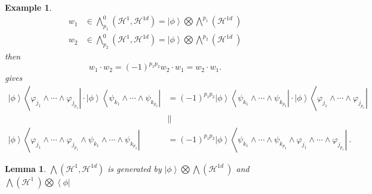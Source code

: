 \documentclass[aps,preprint]{revtex4}%
\newtheorem{example}[theorem]{Example}
\newtheorem{lemma}[theorem]{Lemma}
\begin{document}
\begin{example}%
\begin{align}
w_{1}  &  \in%
{\textstyle\bigwedge\nolimits_{p_{1}}^{0}}
\left(  \mathcal{H}^{1},\mathcal{H}^{1d}\right)  =\left\vert \phi
\right\rangle
{\textstyle\bigotimes}
{\textstyle\bigwedge\nolimits^{p_{1}}}
\left(  \mathcal{H}^{1d}\ \right) \\
w_{2}  &  \in%
{\textstyle\bigwedge\nolimits_{p_{2}}^{0}}
\left(  \mathcal{H}^{1},\mathcal{H}^{1d}\right)  =\left\vert \phi
\right\rangle
{\textstyle\bigotimes}
{\textstyle\bigwedge\nolimits^{p_{2}}}
\left(  \mathcal{H}^{1d}\ \right)
\end{align}
then
\begin{equation}
w_{1}\cdot w_{2}=\left(  -1\right)  ^{p_{1}p_{2}}w_{2}\cdot w_{1}=w_{2}\cdot
w_{1}.
\end{equation}
gives
\begin{align}
\left\vert \phi\right\rangle \left\langle \varphi_{j_{1}}\wedge\cdots
\wedge\varphi_{j_{p_{1}}}\right\vert \cdot\left\vert \phi\right\rangle
\left\langle \psi_{k_{1}}\wedge\cdots\wedge\psi_{k_{p_{2}}}\right\vert  &
=\left(  -1\right)  ^{p_{1}p_{2}}\left\vert \phi\right\rangle \left\langle
\psi_{k_{1}}\wedge\cdots\wedge\psi_{k_{p_{2}}}\right\vert \cdot\left\vert
\phi\right\rangle \left\langle \varphi_{j_{1}}\wedge\cdots\wedge
\varphi_{j_{p_{1}}}\right\vert \\
&  \parallel\\
\left\vert \phi\right\rangle \left\langle \varphi_{j_{1}}\wedge\cdots
\wedge\varphi_{j_{p_{1}}}\wedge\psi_{k_{1}}\wedge\cdots\wedge\psi_{k_{p_{2}}%
}\right\vert  &  =\left(  -1\right)  ^{p_{1}p_{2}}\left\vert \phi\right\rangle
\left\langle \psi_{k_{1}}\wedge\cdots\wedge\psi_{k_{p_{2}}}\wedge
\varphi_{j_{1}}\wedge\cdots\wedge\varphi_{j_{p_{1}}}\right\vert \ .
\end{align}

\end{example}

\begin{lemma}
$%
{\textstyle\bigwedge}
\left(  \mathcal{H}^{1},\mathcal{H}^{1d}\right)  $ is generated by $\left\vert
\phi\right\rangle
{\textstyle\bigotimes}
{\textstyle\bigwedge}
\left(  \mathcal{H}^{1d}\ \right)  $ and $%
{\textstyle\bigwedge}
\left(  \mathcal{H}^{1}\ \right)
{\textstyle\bigotimes}
\left\langle \phi\right\vert $
\end{lemma}
\end{document}
